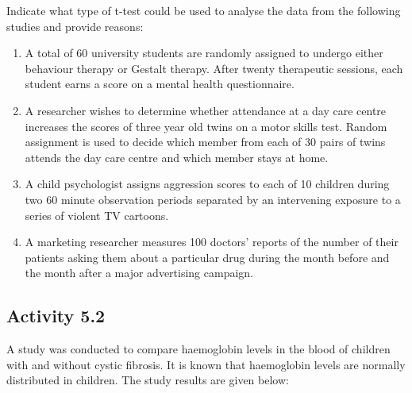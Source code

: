 \documentclass[
]{memoir}
\providecommand{\tightlist}{%
  \setlength{\itemsep}{0pt}\setlength{\parskip}{0pt}}
\begin{document}
Indicate what type of t-test could be used to analyse the data from the following studies and provide reasons:

\begin{enumerate}
\def\labelenumi{\alph{enumi})}
\tightlist
\item
  A total of 60 university students are randomly assigned to undergo either behaviour therapy or Gestalt therapy. After twenty therapeutic sessions, each student earns a score on a mental health questionnaire.
\item
  A researcher wishes to determine whether attendance at a day care centre increases the scores of three year old twins on a motor skills test. Random assignment is used to decide which member from each of 30 pairs of twins attends the day care centre and which member stays at home.
\item
  A child psychologist assigns aggression scores to each of 10 children during two 60 minute observation periods separated by an intervening exposure to a series of violent TV cartoons.
\item
  A marketing researcher measures 100 doctors' reports of the number of their patients asking them about a particular drug during the month before and the month after a major advertising campaign.
\end{enumerate}

\hypertarget{activity-5.2}{%
\subsection*{Activity 5.2}\label{activity-5.2}}

A study was conducted to compare haemoglobin levels in the blood of children with and without cystic fibrosis. It is known that haemoglobin levels are normally distributed in children. The study results are given below:

 
  \providecommand{\huxb}[2]{\arrayrulecolor[RGB]{#1}\global\arrayrulewidth=#2pt}
  \providecommand{\huxvb}[2]{\color[RGB]{#1}\vrule width #2pt}
  \providecommand{\huxtpad}[1]{\rule{0pt}{#1}}
  \providecommand{\huxbpad}[1]{\rule[-#1]{0pt}{#1}}
\end{document}
